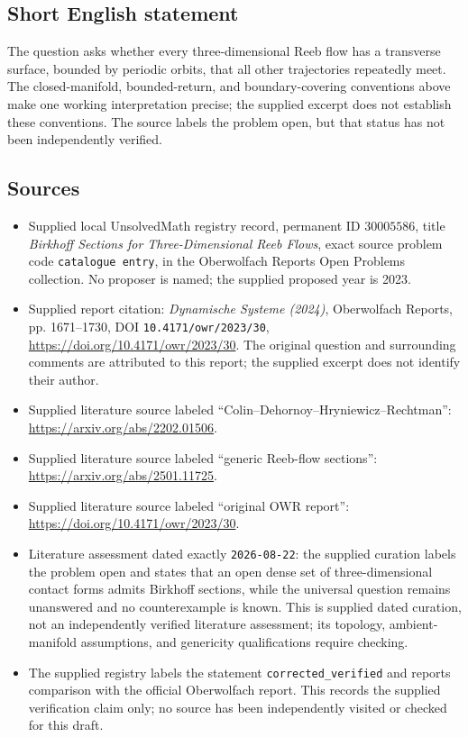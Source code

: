 \documentclass[11pt]{article}
\begin{document}
\subsection{Short English statement}
The question asks whether every three-dimensional Reeb flow has a transverse surface, bounded by periodic orbits, that all other trajectories repeatedly meet. The closed-manifold, bounded-return, and boundary-covering conventions above make one working interpretation precise; the supplied excerpt does not establish these conventions. The source labels the problem open, but that status has not been independently verified.
\subsection{Sources}
\begin{itemize}
\item Supplied local UnsolvedMath registry record, permanent ID \(30005586\), title \emph{Birkhoff Sections for Three-Dimensional Reeb Flows}, exact source problem code \texttt{catalogue entry}, in the Oberwolfach Reports Open Problems collection. No proposer is named; the supplied proposed year is 2023.
\item Supplied report citation: \emph{Dynamische Systeme (2024)}, Oberwolfach Reports, pp. 1671--1730, DOI \texttt{10.4171/owr/2023/30}, \url{https://doi.org/10.4171/owr/2023/30}. The original question and surrounding comments are attributed to this report; the supplied excerpt does not identify their author.
\item Supplied literature source labeled ``Colin--Dehornoy--Hryniewicz--Rechtman'': \url{https://arxiv.org/abs/2202.01506}.
\item Supplied literature source labeled ``generic Reeb-flow sections'': \url{https://arxiv.org/abs/2501.11725}.
\item Supplied literature source labeled ``original OWR report'': \url{https://doi.org/10.4171/owr/2023/30}.
\item Literature assessment dated exactly \texttt{2026-08-22}: the supplied curation labels the problem open and states that an open dense set of three-dimensional contact forms admits Birkhoff sections, while the universal question remains unanswered and no counterexample is known. This is supplied dated curation, not an independently verified literature assessment; its topology, ambient-manifold assumptions, and genericity qualifications require checking.
\item The supplied registry labels the statement \texttt{corrected\_verified} and reports comparison with the official Oberwolfach report. This records the supplied verification claim only; no source has been independently visited or checked for this draft.
\end{itemize}
\end{document}

